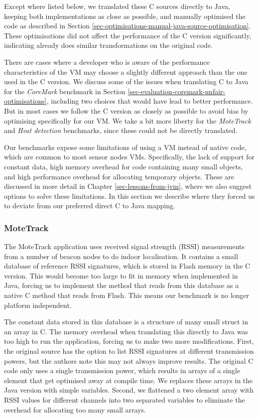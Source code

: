 Except where listed below, we translated these C sources directly to Java, keeping both implementations as close as possible, and manually optimised the code as described in Section \ref{sec-optimisations-manual-java-source-optimisation}. These optimisations did not affect the performance of the C version significantly, indicating  already does similar transformations on the original code.

There are cases where a developer who is aware of the performance characteristics of the VM may choose a slightly different approach than the one used in the C version. We discuss some of the issues when translating C to Java for the \emph{CoreMark} benchmark in Section \ref{sec-evaluation-coremark-unfair-optimisations}, including two choices that would have lead to better performance. But in most cases we follow the C version as closely as possible to avoid bias by optimising specifically for our VM. We take a bit more liberty for the \emph{MoteTrack} and \emph{Heat detection} benchmarks, since these could not be directly translated.

Our benchmarks expose some limitations of using a VM instead of native code, which are common to most sensor nodes VMs. Specifically, the lack of support for constant data, high memory overhead for code containing many small objects, and high performance overhead for allocating temporary objects. These are discussed in more detail in Chapter \ref{sec-lessons-from-jvm}, where we also suggest options to solve these limitations. In this section we describe where they forced us to deviate from our preferred direct C to Java mapping.


\subsubsection{MoteTrack}
\label{sec-evaluation-benchmark-implementation-motetrack}
The MoteTrack application uses received signal strength (RSSI) measurements from a number of beacon nodes to do indoor localisation. It contains a small database of reference RSSI signatures, which is stored in Flash memory in the C version. This would become too large to fit in memory when implemented in Java, forcing us to implement the method that reads from this database as a native C method that reads from Flash. This means our benchmark is no longer platform independent.

The constant data stored in this database is a structure of many small struct in an array in C. The memory overhead when translating this directly to Java was too high to run the application, forcing us to make two more modifications. First, the original source has the option to list RSSI signatures at different transmission powers, but the authors note this may not always improve results. The original C code only uses a single transmission power, which results in arrays of a single element that get optimised away at compile time. We replaces these arrays in the Java version with simple variables. Second, we flattened a two element array with RSSI values for different channels into two separated variables to eliminate the overhead for allocating too many small arrays.

